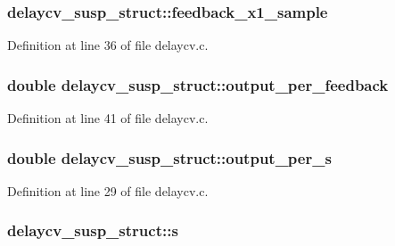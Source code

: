 \subsubsection[{\texorpdfstring{feedback\+\_\+x1\+\_\+sample}{feedback_x1_sample}}]{ delaycv\+\_\+susp\+\_\+struct\+::feedback\+\_\+x1\+\_\+sample}\hypertarget{structdelaycv__susp__struct_a93e7ef381a7b92a7d4d48bd13dda2f70}{}\label{structdelaycv__susp__struct_a93e7ef381a7b92a7d4d48bd13dda2f70}


Definition at line 36 of file delaycv.\+c.

\subsubsection[{\texorpdfstring{output\+\_\+per\+\_\+feedback}{output_per_feedback}}]{\setlength{\rightskip}{0pt plus 5cm}double delaycv\+\_\+susp\+\_\+struct\+::output\+\_\+per\+\_\+feedback}\hypertarget{structdelaycv__susp__struct_a6f1586274b69a00f214372ddf10a2948}{}\label{structdelaycv__susp__struct_a6f1586274b69a00f214372ddf10a2948}


Definition at line 41 of file delaycv.\+c.

\subsubsection[{\texorpdfstring{output\+\_\+per\+\_\+s}{output_per_s}}]{\setlength{\rightskip}{0pt plus 5cm}double delaycv\+\_\+susp\+\_\+struct\+::output\+\_\+per\+\_\+s}\hypertarget{structdelaycv__susp__struct_a889a7a6da1172ba04e82ef4ced284536}{}\label{structdelaycv__susp__struct_a889a7a6da1172ba04e82ef4ced284536}


Definition at line 29 of file delaycv.\+c.

\subsubsection[{\texorpdfstring{s}{s}}]{ delaycv\+\_\+susp\+\_\+struct\+::s}\hypertarget{structdelaycv__susp__struct_ac4a8cdd94d41d18c86347950ac48c43a}{}\label{structdelaycv__susp__struct_ac4a8cdd94d41d18c86347950ac48c43a}


